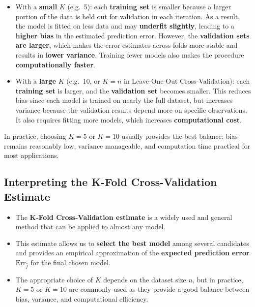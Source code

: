 \documentclass[
  letterpaper,
  DIV=11,
  numbers=noendperiod]{scrartcl}
\providecommand{\tightlist}{%
  \setlength{\itemsep}{0pt}\setlength{\parskip}{0pt}}\usepackage{longtable,booktabs,array}
\begin{document}
\begin{itemize}
\item
  With a \textbf{small} \(K\) (e.g.~5): each \textbf{training set} is
  smaller because a larger portion of the data is held out for
  validation in each iteration. As a result, the model is fitted on less
  data and may \textbf{underfit slightly}, leading to a \textbf{higher
  bias} in the estimated prediction error. However, the
  \textbf{validation sets are larger}, which makes the error estimates
  across folds more stable and results in \textbf{lower variance}.
  Training fewer models also makes the procedure \textbf{computationally
  faster}.
\item
  With a \textbf{large} \(K\) (e.g.~10, or \(K = n\) in Leave-One-Out
  Cross-Validation): each \textbf{training set} is larger, and the
  \textbf{validation set} becomes smaller. This reduces bias since each
  model is trained on nearly the full dataset, but increases variance
  because the validation results depend more on specific observations.
  It also requires fitting more models, which increases
  \textbf{computational cost}.
\end{itemize}

In practice, choosing \(K = 5\) or \(K = 10\) usually provides the best
balance: bias remains reasonably low, variance manageable, and
computation time practical for most applications.

\subsection{Interpreting the K-Fold Cross-Validation
Estimate}\label{interpreting-the-k-fold-cross-validation-estimate}

\begin{itemize}
\tightlist
\item
  The \textbf{K-Fold Cross-Validation estimate} is a widely used and
  general method that can be applied to almost any model.\\
\item
  This estimate allows us to \textbf{select the best model} among
  several candidates and provides an empirical approximation of the
  \textbf{expected prediction error} \(\text{Err}_{\hat{f}}\) for the
  final chosen model.\\
\item
  The appropriate choice of \(K\) depends on the dataset size \(n\), but
  in practice, \(K = 5\) or \(K = 10\) are commonly used as they provide
  a good balance between bias, variance, and computational efficiency.
\end{itemize}
\end{document}
